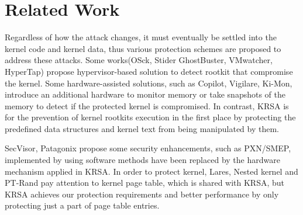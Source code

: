 \documentclass[conference]{IEEEtran}
\begin{document}
%



\fi

\iffalse
\section{Related Work}
Regardless of how the attack changes, it must eventually be settled into the kernel code and kernel data, thus various protection schemes are proposed to address these attacks. 
Some works(OSck\cite{ensosck}, Stider GhostBuster\cite{strider}, VMwatcher\cite{outbox}, HyperTap\cite{invariant}) propose hypervisor-based solution to detect rootkit that compromise the kernel. Some hardware-assisted solutions, such as Copilot\cite{coplilot}, Vigilare\cite{vigilare}, Ki-Mon\cite{ki-mon}, introduce an additional hardware to monitor memory or take snapshots of the memory to detect if the protected kernel is compromised. In contrast, KRSA is for the prevention of kernel rootkits execution in the first place by protecting the predefined data structures and kernel text from being manipulated by them.

SecVisor\cite{secvisor}, Patagonix\cite{hyperbina} propose some security enhancements, such as PXN/SMEP, implemented by using software methods have been replaced by the hardware mechanism applied in KRSA. In order to protect kernel, Lares\cite{secarch}, Nested kernel\cite{nest15} and PT-Rand\cite{ptrand} pay attention to kernel page table, which is shared with KRSA, but KRSA achieves our protection requirements and better performance by only protecting just a part of page table entries. 
\end{document}
